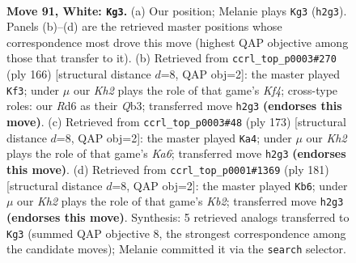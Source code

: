 \documentclass[11pt]{article}
\begin{document}
\clearpage

\begin{figure}[p]\centering
\begin{subfigure}{0.46\textwidth}\centering
\resizebox{\linewidth}{!}{%
\newchessgame
\chessboard[
  setfen={5rk1/P7/3R4/8/8/8/7K/8 w - - 51 91},
  showmover=false,
  pgfstyle=straightmove, color=movearrow, markmove={h2-g3}
]}
\caption{}
\end{subfigure}\hfill
\begin{subfigure}{0.46\textwidth}\centering
\resizebox{\linewidth}{!}{%
\newchessgame
\chessboard[
  setfen={8/8/8/8/5K2/1Q6/3kr3/8 w - - 25 84},
  showmover=false,
  pgfstyle=straightmove, color=movearrow, markmove={f4-f3}
]}
\caption{}
\end{subfigure}
\\[4pt]
\begin{subfigure}{0.46\textwidth}\centering
\resizebox{\linewidth}{!}{%
\newchessgame
\chessboard[
  setfen={8/8/KR6/8/8/k7/8/8 b - - 8 87},
  showmover=false,
  pgfstyle=straightmove, color=movearrow, markmove={a3-a4}
]}
\caption{}
\end{subfigure}\hfill
\begin{subfigure}{0.46\textwidth}\centering
\resizebox{\linewidth}{!}{%
\newchessgame
\chessboard[
  setfen={8/1k6/8/2R5/2K5/8/8/8 b - - 15 91},
  showmover=false,
  pgfstyle=straightmove, color=movearrow, markmove={b7-b6}
]}
\caption{}
\end{subfigure}
\caption{\textbf{Move 91, White: \texttt{Kg3}.} (a) Our position; Melanie plays \texttt{Kg3} (\texttt{h2g3}). Panels (b)--(d) are the retrieved master positions whose correspondence most drove this move (highest QAP objective among those that transfer to it). (b) Retrieved from \texttt{ccrl\_top\_p0003\#270} (ply 166) [structural distance $d$=8, QAP obj=2]: the master played \texttt{Kf3}; under $\mu$ our \emph{Kh2} plays the role of that game's \emph{Kf4}; cross-type roles: our \emph{R}d6 as their \emph{Q}b3; transferred move \texttt{h2g3} \textbf{(endorses this move)}. (c) Retrieved from \texttt{ccrl\_top\_p0003\#48} (ply 173) [structural distance $d$=8, QAP obj=2]: the master played \texttt{Ka4}; under $\mu$ our \emph{Kh2} plays the role of that game's \emph{Ka6}; transferred move \texttt{h2g3} \textbf{(endorses this move)}. (d) Retrieved from \texttt{ccrl\_top\_p0001\#1369} (ply 181) [structural distance $d$=8, QAP obj=2]: the master played \texttt{Kb6}; under $\mu$ our \emph{Kh2} plays the role of that game's \emph{Kb2}; transferred move \texttt{h2g3} \textbf{(endorses this move)}. Synthesis: 5 retrieved analogs transferred to \texttt{Kg3} (summed QAP objective 8, the strongest correspondence among the candidate moves); Melanie committed it via the \texttt{search} selector.}
\label{fig:thought-m180}
\end{figure}
\end{document}
